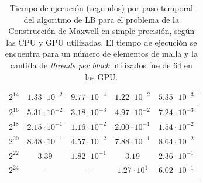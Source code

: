 \begin{table}[H]
{\begin{tabular}{|c|c|c|c|c|}
	$2^{14}$	&      $1.33\cdot10^{-2}$                                                            &$9.77\cdot10^{-4}$                       &$1.22\cdot10^{-2}$                             &$5.35\cdot10^{-3}$                                                                      \\ \hline
$2^{16}$		&    $5.31\cdot10^{-2}$               & $3.18\cdot10^{-3}$                   & $4.97\cdot10^{-2}$                                                                  & $7.24\cdot10^{-3}$                                                                     \\ \hline
$2^{18}$		& $2.15\cdot10^{-1}$                                                                 &$1.16\cdot10^{-2}$                             &$2.00\cdot10^{-1}$                                         &$1.54\cdot10^{-2}$   \\ \hline
	$2^{20}$	&    $8.48\cdot10^{-1}$                                                              &               $4.57\cdot10^{-2}$                                                       &    $7.88\cdot10^{-1}$                                                              &    $8.64\cdot10^{-2}$                                                                  \\ \hline
		$2^{22}$& $3.39$                       & $1.82\cdot10^{-1}$                                  & $3.19$                                     &$2.36\cdot10^{-1}$                \\ \hline
		$2^{24}$& -                                                                  &          -                                                            & $1.27\cdot10^{1}$                                                                 &$6.02\cdot10^{-1}$                                                                      \\ \hline
	\end{tabular}}
\caption{Tiempo de ejecución (segundos) por paso temporal del algoritmo de LB  para el problema de la Construcción de Maxwell en simple precisión, según las CPU y GPU utilizadas. El tiempo de ejecución se encuentra para un número de elementos de malla y la cantida de \textit{threads per block} utilizados fue de 64 en las GPU.}
\label{tab:MXC_tiempos}
\end{table}



